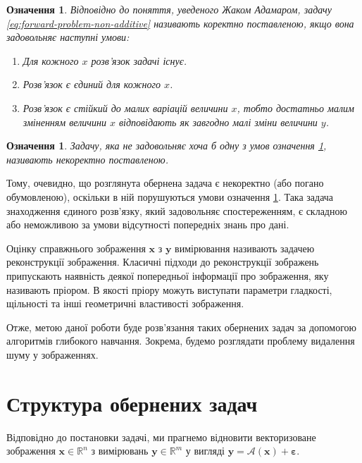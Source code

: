 \documentclass[14pt,a4paper]{extarticle}
\newcounter{e}
\newtheorem{defn}[theorem]{Означення}
\numberwithin{equation}{section}
\numberwithin{figure}{section}
\begin{document}
	\begin{defn}
		\label{def:well-posed}
		Відповідно до поняття, уведеного Жаком Адамаром, задачу \ref{eq:forward-problem-non-additive} називають коректно поставленою, якщо вона задовольняє наступні умови: 
		\begin{enumerate}
			\item Для кожного $x$ розв'язок задачі існує.
			\item Розв'язок є єдиний для кожного $x$.
			\item Розв'язок є стійкий до малих варіацій величини $x$, тобто достатньо малим зміненням величини $x$ відповідають як завгодно малі зміни величини $y$.
		\end{enumerate}
	\end{defn}

	\begin{defn}
		\label{def:ill-posed}	
		Задачу, яка не задовольняє хоча б одну з умов означення \ref{def:well-posed}, називають некоректно поставленою.
	\end{defn}

	Тому, очевидно, що розглянута обернена задача є некоректно (або погано обумовленою), оскільки в ній порушуються умови означення \ref{def:well-posed}. Така задача знаходження єдиного розв'язку, який задовольняє спостереженням, є складною або неможливою за умови відсутності попередніх знань про дані.

	Оцінку справжнього зображення $\boldsymbol{x}$ з $\boldsymbol{y}$  вимірювання називають задачею реконструкції зображення. Класичні підходи до реконструкції зображень припускають наявність деякої попередньої інформації про зображення, яку називають пріором. В якості пріору можуть виступати параметри гладкості, щільності та інші геометричні властивості зображення.

	Отже, метою даної роботи буде розв'язання таких обернених задач за допомогою алгоритмів глибокого навчання. Зокрема, будемо розглядати проблему видалення шуму у зображеннях.

	\newpage
	\thispagestyle{empty}
	\section{Структура обернених задач}

	Відповідно до постановки задачі, ми прагнемо відновити векторизоване зображення $\boldsymbol{x} \in \mathbb{R}^{n}$ з вимірювань $\boldsymbol{y} \in \mathbb{R}^{m}$ у вигляді $\boldsymbol{y}=\mathcal{A}\left(\boldsymbol{x}\right)+\boldsymbol{\varepsilon}$.
\end{document}

